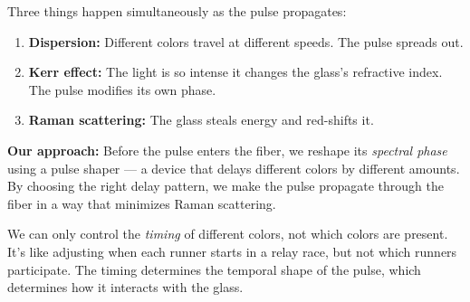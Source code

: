 \documentclass[12pt,a4paper]{article}
\begin{document}
Three things happen simultaneously as the pulse propagates:
\begin{enumerate}
    \item \textbf{Dispersion:} Different colors travel at different speeds. The pulse spreads out.
    \item \textbf{Kerr effect:} The light is so intense it changes the glass's refractive index. The pulse modifies its own phase.
    \item \textbf{Raman scattering:} The glass steals energy and red-shifts it.
\end{enumerate}

\textbf{Our approach:} Before the pulse enters the fiber, we reshape its \emph{spectral phase} using a pulse shaper --- a device that delays different colors by different amounts. By choosing the right delay pattern, we make the pulse propagate through the fiber in a way that minimizes Raman scattering.

\begin{intuition}
We can only control the \emph{timing} of different colors, not which colors are present. It's like adjusting when each runner starts in a relay race, but not which runners participate. The timing determines the temporal shape of the pulse, which determines how it interacts with the glass.
\end{intuition}
\end{document}
